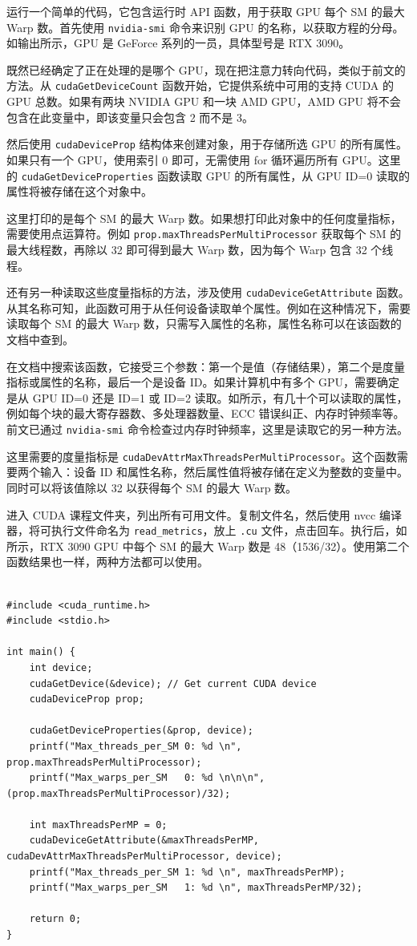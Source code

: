 运行一个简单的代码，它包含运行时 API 函数，用于获取 GPU 每个 SM 的最大 Warp 数。首先使用 \texttt{nvidia-smi} 命令来识别 GPU 的名称，以获取方程的分母。如输出所示，GPU 是 GeForce 系列的一员，具体型号是 RTX 3090。

既然已经确定了正在处理的是哪个 GPU，现在把注意力转向代码，类似于前文的方法。从 \texttt{cudaGetDeviceCount} 函数开始，它提供系统中可用的支持 CUDA 的 GPU 总数。如果有两块 NVIDIA GPU 和一块 AMD GPU，AMD GPU 将不会包含在此变量中，即该变量只会包含 2 而不是 3。

然后使用 \texttt{cudaDeviceProp} 结构体来创建对象，用于存储所选 GPU 的所有属性。如果只有一个 GPU，使用索引 0 即可，无需使用 for 循环遍历所有 GPU。这里的 \texttt{cudaGetDeviceProperties} 函数读取 GPU 的所有属性，从 GPU ID=0 读取的属性将被存储在这个对象中。

这里打印的是每个 SM 的最大 Warp 数。如果想打印此对象中的任何度量指标，需要使用点运算符。例如 \texttt{prop.maxThreadsPerMultiProcessor} 获取每个 SM 的最大线程数，再除以 32 即可得到最大 Warp 数，因为每个 Warp 包含 32 个线程。

还有另一种读取这些度量指标的方法，涉及使用 \texttt{cudaDeviceGetAttribute} 函数。从其名称可知，此函数可用于从任何设备读取单个属性。例如在这种情况下，需要读取每个 SM 的最大 Warp 数，只需写入属性的名称，属性名称可以在该函数的文档中查到。

在文档中搜索该函数，它接受三个参数：第一个是值（存储结果），第二个是度量指标或属性的名称，最后一个是设备 ID。如果计算机中有多个 GPU，需要确定是从 GPU ID=0 还是 ID=1 或 ID=2 读取。如所示，有几十个可以读取的属性，例如每个块的最大寄存器数、多处理器数量、ECC 错误纠正、内存时钟频率等。前文已通过 \texttt{nvidia-smi} 命令检查过内存时钟频率，这里是读取它的另一种方法。

这里需要的度量指标是 \texttt{cudaDevAttrMaxThreadsPerMultiProcessor}。这个函数需要两个输入：设备 ID 和属性名称，然后属性值将被存储在定义为整数的变量中。同时可以将该值除以 32 以获得每个 SM 的最大 Warp 数。

进入 CUDA 课程文件夹，列出所有可用文件。复制文件名，然后使用 nvcc 编译器，将可执行文件命名为 \texttt{read\_metrics}，放上 \texttt{.cu} 文件，点击回车。执行后，如所示，RTX 3090 GPU 中每个 SM 的最大 Warp 数是 48（1536/32）。使用第二个函数结果也一样，两种方法都可以使用。

\begin{lstlisting}

#include <cuda_runtime.h>
#include <stdio.h>

int main() {
    int device;
    cudaGetDevice(&device); // Get current CUDA device
    cudaDeviceProp prop;

    cudaGetDeviceProperties(&prop, device);
    printf("Max_threads_per_SM 0: %d \n", prop.maxThreadsPerMultiProcessor);
    printf("Max_warps_per_SM   0: %d \n\n\n", (prop.maxThreadsPerMultiProcessor)/32);

    int maxThreadsPerMP = 0;
    cudaDeviceGetAttribute(&maxThreadsPerMP, cudaDevAttrMaxThreadsPerMultiProcessor, device);
    printf("Max_threads_per_SM 1: %d \n", maxThreadsPerMP);
    printf("Max_warps_per_SM   1: %d \n", maxThreadsPerMP/32);

    return 0;
}

\end{lstlisting}



